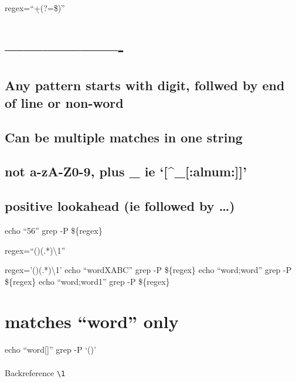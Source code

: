 \documentclass[
  letterpaper,
  DIV=11,
  numbers=noendperiod]{scrartcl}
\makeatletter
\let\oldparagraph\paragraph
\renewcommand{\paragraph}{
    \@ifstar
      \xxxParagraphStar
      \xxxParagraphNoStar
  }
\newcommand{\xxxParagraphStar}[1]{\oldparagraph*{#1}\mbox{}}
\newcommand{\xxxParagraphNoStar}[1]{\oldparagraph{#1}\mbox{}}
\makeatother
\begin{document}
regex=``\d+(?=\W\textbar\$)''

\section{-------------------}\label{section-1}

\subsection{Any pattern starts with digit, follwed by end of line or
non-word}\label{any-pattern-starts-with-digit-follwed-by-end-of-line-or-non-word}

\subsection{Can be multiple matches in one
string}\label{can-be-multiple-matches-in-one-string}

\subsection{\texorpdfstring{\W  not a-zA-Z0-9, plus \_ ie
`{[}\^{}\_{[}:alnum:{]}{]}'}{not a-zA-Z0-9, plus \_ ie `{[}\^{}\_{[}:alnum:{]}{]}'}}\label{not-a-za-z0-9-plus-_-ie-_alnum}

\subsection{positive lookahead (ie followed by
\ldots)}\label{positive-lookahead-ie-followed-by}

echo ``56'' grep -P \$\{regex\}

regex=``(\w*)(.*)\textbackslash1''

regex='(\w*)(.*)\textbackslash1' echo ``wordXABC'' \textbar{} grep -P
\$\{regex\} echo ``word;word'' \textbar{} grep -P \$\{regex\} echo
``word;word1'' \textbar{} grep -P \$\{regex\}

\section{matches ``word'' only}\label{matches-word-only}

echo ``word{[}{]}'' \textbar{} grep -P `(\w*)'

\paragraph{\texorpdfstring{Backreference
\texttt{\textbackslash{}1}}{Backreference \textbackslash1}}\label{backreference-1}
\end{document}
